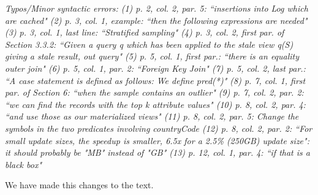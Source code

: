 \vspace{1em}
\emph{Typos/Minor syntactic errors:
(1) p. 2, col. 2, par. 5: ``insertions into Log which are cached"
(2) p. 3, col. 1, example: ``then the following expressions are needed"
(3) p. 3, col. 1, last line: ``Stratified sampling"
(4) p. 3, col. 2, first par. of Section 3.3.2: ``Given a query q which has been applied to the stale view q(S) giving a stale result, out query"
(5) p. 5, col. 1, first par.: ``there is an equality outer join"
(6) p. 5, col. 1, par. 2: ``Foreign Key Join"
(7) p. 5, col. 2, last par.: ``A case statement is defined as follows: We define pred(*)"
(8) p. 7, col. 1, first par. of Section 6: ``when the sample contains an outlier"
(9) p. 7, col. 2, par. 2: ``we can find the records with the top k attribute values"
(10) p. 8, col. 2, par. 4: ``and use those as our materialized views"
(11) p. 8, col. 2, par. 5: Change the symbols in the two predicates involving countryCode
(12) p. 8, col. 2, par. 2: ``For small update sizes, the speedup is smaller, 6.5x for a 2.5\% (250GB) update size": it should probably be "MB" instead of "GB"
(13) p. 12, col. 1, par. 4: ``if that is a black box"}

We have made this changes to the text.



\clearpage






























































































 


